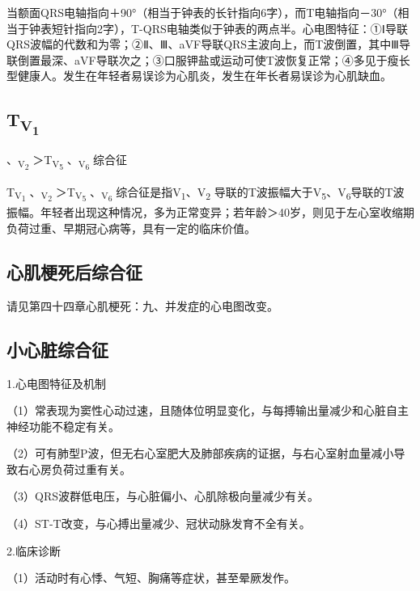 当额面QRS电轴指向＋90°（相当于钟表的长针指向6字），而T电轴指向－30°（相当于钟表短针指向2字），T-QRS电轴类似于钟表的两点半。心电图特征：①Ⅰ导联QRS波幅的代数和为零；②Ⅱ、Ⅲ、aVF导联QRS主波向上，而T波倒置，其中Ⅲ导联倒置最深、aVF导联次之；③口服钾盐或运动可使T波恢复正常；④多见于瘦长型健康人。发生在年轻者易误诊为心肌炎，发生在年长者易误诊为心肌缺血。

\protect\hypertarget{text00047.htmlux5cux23subid563}{}{}

\subsection{T\textsubscript{V\textsubscript{1}}}
、\textsubscript{V\textsubscript{2}}
＞T\textsubscript{V\textsubscript{5}}
、\textsubscript{V\textsubscript{6}} 综合征

T\textsubscript{V\textsubscript{1}} 、\textsubscript{V\textsubscript{2}}
＞T\textsubscript{V\textsubscript{5}}
、\textsubscript{V\textsubscript{6}} 综合征是指V\textsubscript{1}、V\textsubscript{2} 导联的T波振幅大于V\textsubscript{5}、V\textsubscript{6}导联的T波振幅。年轻者出现这种情况，多为正常变异；若年龄＞40岁，则见于左心室收缩期负荷过重、早期冠心病等，具有一定的临床价值。

\protect\hypertarget{text00047.htmlux5cux23subid564}{}{}

\subsection{心肌梗死后综合征}

请见第四十四章心肌梗死：九、并发症的心电图改变。

\protect\hypertarget{text00047.htmlux5cux23subid565}{}{}

\subsection{小心脏综合征}

1.心电图特征及机制

（1）常表现为窦性心动过速，且随体位明显变化，与每搏输出量减少和心脏自主神经功能不稳定有关。

（2）可有肺型P波，但无右心室肥大及肺部疾病的证据，与右心室射血量减小导致右心房负荷过重有关。

（3）QRS波群低电压，与心脏偏小、心肌除极向量减少有关。

（4）ST-T改变，与心搏出量减少、冠状动脉发育不全有关。

2.临床诊断

（1）活动时有心悸、气短、胸痛等症状，甚至晕厥发作。

